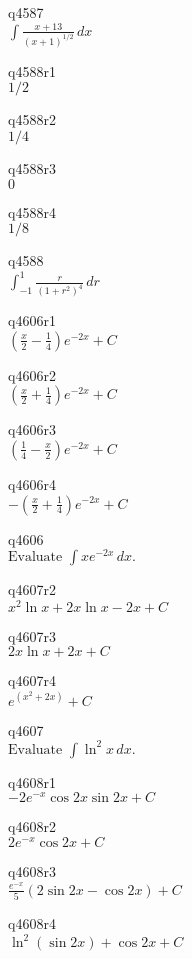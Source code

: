 q4587\\
\(\displaystyle \int \frac{x+13}{(x+1)^{1/2}}\,dx \)

q4588r1\\
\(\displaystyle 1/2 \)

q4588r2\\
\(\displaystyle 1/4 \)

q4588r3\\
\(\displaystyle 0 \)

q4588r4\\
\(\displaystyle 1/8 \)

q4588\\
\(\displaystyle \int_{-1}^1 \frac{r}{(1+r^2)^4}\,dr \)

q4606r1\\
\(\displaystyle \left ( \frac{x}{2} - \frac{1}{4} \right ) e^{-2x} + C \)

q4606r2\\
\(\displaystyle \left ( \frac{x}{2} + \frac{1}{4} \right ) e^{-2x} + C \)

q4606r3\\
\(\displaystyle \left ( \frac{1}{4} - \frac{x}{2} \right ) e^{-2x} + C \)

q4606r4\\
\(\displaystyle -\left ( \frac{x}{2} + \frac{1}{4} \right ) e^{-2x} + C \)

q4606\\
\(\displaystyle \text{Evaluate } \int x e^{-2x}\,dx. \)

q4607r2\\
\(\displaystyle x^2 \ln x + 2x \ln x - 2x + C \)

q4607r3\\
\(\displaystyle 2x \ln x + 2x + C \)

q4607r4\\
\(\displaystyle e^{(x^2 + 2x)} + C \)

q4607\\
\(\displaystyle \text{Evaluate } \int \ln^2 x \, dx. \)

q4608r1\\
\(\displaystyle -2e^{-x} \cos 2x \sin 2x + C \)

q4608r2\\
\(\displaystyle 2e^{-x} \cos 2x + C \)

q4608r3\\
\(\displaystyle \frac{e^{-x}}{5} (2\sin 2x - \cos 2x) + C \)

q4608r4\\
\(\displaystyle \ln^2 (\sin 2x) + \cos 2x + C \)

